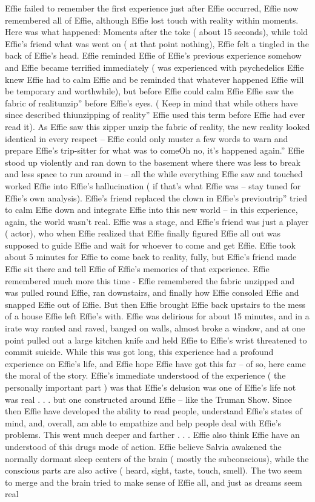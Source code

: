 \documentclass[12pt]{book}
\begin{document}
Effie failed to remember the first experience just after Effie occurred, Effie now remembered all of Effie, although Effie lost touch with reality within moments. Here was what happened: Moments after the toke ( about 15 seconds), while told Effie's friend what was went on ( at that point nothing), Effie felt a tingled in the back of Effie's head. Effie reminded Effie of Effie's previous experience somehow and Effie became terrified immediately ( was experienced with psychedelics Effie knew Effie had to calm Effie and be reminded that whatever happened Effie will be temporary and worthwhile), but before Effie could calm Effie Effie saw the fabric of realitunzip'' before Effie's eyes. ( Keep in mind that while others have since described thiunzipping of reality'' Effie used this term before Effie had ever read it). As Effie saw this zipper unzip the fabric of reality, the new reality looked identical in every respect -- Effie could only muster a few words to warn and prepare Effie's trip-sitter for what was to comeOh no, it's happened again.'' Effie stood up violently and ran down to the basement where there was less to break and less space to run around in -- all the while everything Effie saw and touched worked Effie into Effie's hallucination ( if that's what Effie was -- stay tuned for Effie's own analysis). Effie's friend replaced the clown in Effie's previoutrip'' tried to calm Effie down and integrate Effie into this new world -- in this experience, again, the world wasn't real. Effie was a stage, and Effie's friend was just a player ( actor), who when Effie realized that Effie finally figured Effie all out was supposed to guide Effie and wait for whoever to come and get Effie. Effie took about 5 minutes for Effie to come back to reality, fully, but Effie's friend made Effie sit there and tell Effie of Effie's memories of that experience. Effie remembered much more this time - Effie remembered the fabric unzipped and was pulled round Effie, ran downstairs, and finally how Effie consoled Effie and snapped Effie out of Effie. But then Effie brought Effie back upstairs to the mess of a house Effie left Effie's with. Effie was delirious for about 15 minutes, and in a irate way ranted and raved, banged on walls, almost broke a window, and at one point pulled out a large kitchen knife and held Effie to Effie's wrist threatened to commit suicide. While this was got long, this experience had a profound experience on Effie's life, and Effie hope Effie have got this far -- of so, here came the moral of the story. Effie's immediate understood of the experience ( the personally important part ) was that Effie's delusion was one of Effie's life not was real . . .  but one constructed around Effie -- like the Truman Show. Since then Effie have developed the ability to read people, understand Effie's states of mind, and, overall, am able to empathize and help people deal with Effie's problems. This went much deeper and farther . . .  Effie also think Effie have an understood of this drugs mode of action. Effie believe Salvia awakened the normally dormant sleep centers of the brain ( mostly the subconscious), while the conscious parts are also active ( heard, sight, taste, touch, smell). The two seem to merge and the brain tried to make sense of Effie all, and just as dreams seem real 
\end{document}
